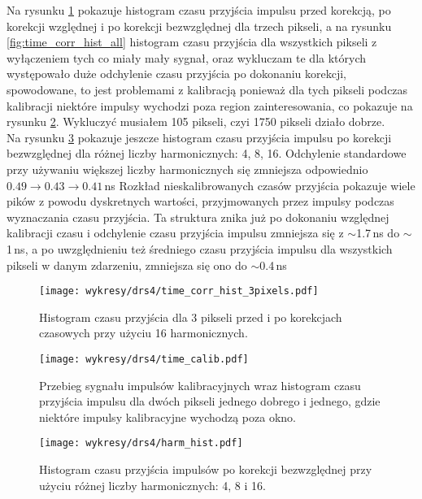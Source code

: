 \documentclass[a4paper,11pt,twoside]{article}
\begin{document}
Na rysunku \ref{fig:time_corr_hist3} pokazuje histogram czasu przyjścia impulsu przed korekcją, po korekcji względnej i po korekcji bezwzględnej dla trzech pikseli, a na rysunku \ref{fig:time_corr_hist_all} histogram czasu przyjścia dla wszystkich pikseli z wyłączeniem tych co miały mały sygnał, oraz wykluczam te dla których występowało duże odchylenie czasu przyjścia po dokonaniu korekcji, spowodowane, to jest problemami z kalibracją ponieważ dla tych pikseli podczas kalibracji niektóre impulsy wychodzi poza region zainteresowania, co pokazuje na rysunku \ref{fig:time_calib}. Wykluczyć musiałem 105 pikseli, czyi 1750 pikseli działo dobrze. \\
Na rysunku \ref{fig:hist_harm} pokazuje jeszcze histogram czasu przyjścia impulsu po korekcji bezwzględnej dla różnej liczby harmonicznych: 4, 8, 16. Odchylenie standardowe przy używaniu większej liczby harmonicznych się zmniejsza odpowiednio $0.49 \rightarrow 0.43 \rightarrow 0.41$\,ns
Rozkład nieskalibrowanych czasów przyjścia pokazuje wiele pików z powodu dyskretnych wartości, przyjmowanych przez impulsy podczas wyznaczania czasu przyjścia. Ta struktura  znika już po dokonaniu  względnej kalibracji czasu i odchylenie czasu przyjścia impulsu zmniejsza się z $\sim$1.7\,ns do $\sim$1\,ns, a po uwzględnieniu też średniego czasu przyjścia impulsu dla wszystkich pikseli w danym zdarzeniu, zmniejsza się ono do $\sim$0.4\,ns

\begin{figure}[H] 
\centering
\texttt{[image: wykresy/drs4/time\_corr\_hist\_3pixels.pdf]}
\caption{Histogram czasu przyjścia dla 3 pikseli przed i po korekcjach czasowych przy użyciu 16 harmonicznych.}
\label{fig:time_corr_hist3}
\end{figure}

\begin{figure}[H] 
\centering
\texttt{[image: wykresy/drs4/time\_calib.pdf]}
\caption{Przebieg sygnału impulsów kalibracyjnych wraz histogram czasu przyjścia impulsu dla dwóch pikseli jednego dobrego i jednego, gdzie niektóre impulsy kalibracyjne wychodzą poza okno.}
\label{fig:time_calib}
\end{figure}

\begin{figure}[H] 
\centering
\texttt{[image: wykresy/drs4/harm\_hist.pdf]}
\caption{Histogram czasu przyjścia impulsów po korekcji bezwzględnej przy użyciu różnej liczby harmonicznych: 4, 8 i 16.}
\label{fig:hist_harm}
\end{figure}
\end{document}
